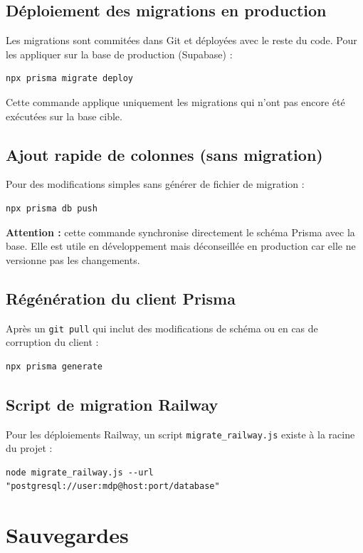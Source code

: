 \documentclass[12pt,a4paper]{report}
\begin{document}
\subsection{Déploiement des migrations en production}

Les migrations sont commitées dans Git et déployées avec le reste du code. Pour les appliquer sur la base de production (Supabase) :

\begin{lstlisting}
npx prisma migrate deploy
\end{lstlisting}

Cette commande applique uniquement les migrations qui n'ont pas encore été exécutées sur la base cible.

\subsection{Ajout rapide de colonnes (sans migration)}

Pour des modifications simples sans générer de fichier de migration :
\begin{lstlisting}
npx prisma db push
\end{lstlisting}

\textbf{Attention :} cette commande synchronise directement le schéma Prisma avec la base. Elle est utile en développement mais déconseillée en production car elle ne versionne pas les changements.

\subsection{Régénération du client Prisma}

Après un \texttt{git pull} qui inclut des modifications de schéma ou en cas de corruption du client :
\begin{lstlisting}
npx prisma generate
\end{lstlisting}

\subsection{Script de migration Railway}

Pour les déploiements Railway, un script \texttt{migrate\_railway.js} existe à la racine du projet :
\begin{lstlisting}
node migrate_railway.js --url "postgresql://user:mdp@host:port/database"
\end{lstlisting}

\section{Sauvegardes}
\end{document}
